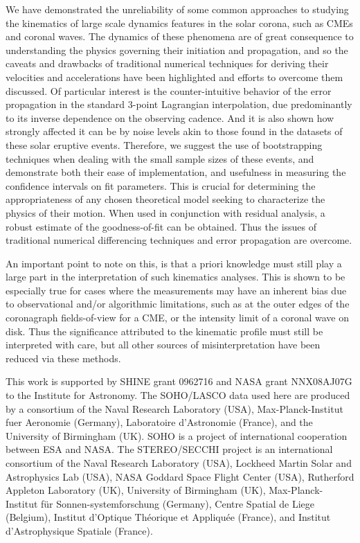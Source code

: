 \documentclass[structabstract]{aa}
\begin{document}
We have demonstrated the unreliability of some common approaches to studying the kinematics of large scale dynamics features in the solar corona, such as CMEs and coronal waves. The dynamics of these phenomena are of great consequence to understanding the physics governing their initiation and propagation, and so the caveats and drawbacks of traditional numerical techniques for deriving their velocities and accelerations have been highlighted and efforts to overcome them discussed. Of particular interest is the counter-intuitive behavior of the error propagation in the standard 3-point Lagrangian interpolation, due predominantly to its inverse dependence on the observing cadence. And it is also shown how strongly affected it can be by noise levels akin to those found in the datasets of these solar eruptive events. Therefore, we suggest the use of bootstrapping techniques when dealing with the small sample sizes of these events, and demonstrate both their ease of implementation, and usefulness in measuring the confidence intervals on fit parameters. This is crucial for determining the appropriateness of any chosen theoretical model seeking to characterize the physics of their motion. When used in conjunction with residual analysis, a robust estimate of the goodness-of-fit can be obtained. Thus the issues of traditional numerical differencing techniques and error propagation are overcome. 

An important point to note on this, is that a priori knowledge must still play a large part in the interpretation of such kinematics analyses. This is shown to be especially true for cases where the measurements may have an inherent bias due to observational and/or algorithmic limitations, such as at the outer edges of the coronagraph fields-of-view for a CME, or the intensity limit of a coronal wave on disk. Thus the significance attributed to the kinematic profile must still be interpreted with care, but all other sources of misinterpretation have been reduced via these methods.


\begin{acknowledgements}
This work is supported by SHINE grant 0962716 and NASA grant NNX08AJ07G to the Institute for Astronomy. The SOHO/LASCO data used here are produced by a consortium of the Naval Research Laboratory (USA), Max-Planck-Institut fuer Aeronomie (Germany), Laboratoire d'Astronomie (France), and the University of Birmingham (UK). SOHO is a project of international cooperation between ESA and NASA. The STEREO/SECCHI project is an international consortium of the Naval Research Laboratory (USA), Lockheed Martin Solar and Astrophysics Lab (USA), NASA Goddard Space Flight Center (USA), Rutherford Appleton Laboratory (UK), University of Birmingham (UK), Max-Planck-Institut f\"{u}r Sonnen-systemforschung (Germany), Centre Spatial de Liege (Belgium), Institut d'Optique Th\'{e}orique et Appliqu\'{e}e (France), and Institut d'Astrophysique Spatiale (France). 
\end{acknowledgements}




  
\end{document}
